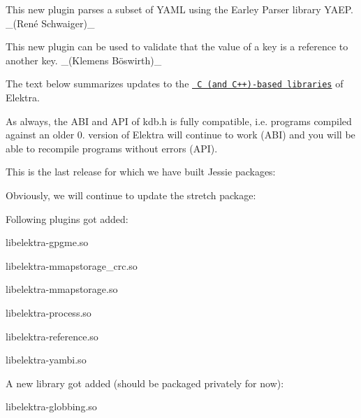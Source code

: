 This new plugin parses a subset of Y\+A\+ML using the Earley Parser library Y\+A\+EP. \+\_\+(René Schwaiger)\+\_\+

This new plugin can be used to validate that the value of a key is a reference to another key. \+\_\+(Klemens Böswirth)\+\_\+

The text below summarizes updates to the \href{https://www.libelektra.org/libraries/readme}{\texttt{ C (and C++)-\/based libraries}} of Elektra.

As always, the A\+BI and A\+PI of kdb.\+h is fully compatible, i.\+e. programs compiled against an older 0. version of Elektra will continue to work (A\+BI) and you will be able to recompile programs without errors (A\+PI).

This is the last release for which we have built Jessie packages\+:


\begin{DoxyCode}{0}
\end{DoxyCode}


Obviously, we will continue to update the stretch package\+:


\begin{DoxyCode}{0}
\end{DoxyCode}


Following plugins got added\+:


\begin{DoxyItemize}
\item libelektra-\/gpgme.\+so
\item libelektra-\/mmapstorage\+\_\+crc.\+so
\item libelektra-\/mmapstorage.\+so
\item libelektra-\/process.\+so
\item libelektra-\/reference.\+so
\item libelektra-\/yambi.\+so
\end{DoxyItemize}

A new library got added (should be packaged privately for now)\+:


\begin{DoxyItemize}
\item libelektra-\/globbing.\+so
\end{DoxyItemize}

